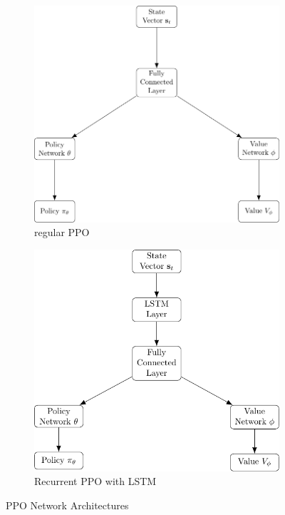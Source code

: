 \begin{figure}[ht!]
    \centering
    \begin{subfigure}{0.45\textwidth}
        \includegraphics[width=\textwidth]{./project3/tikz/ppo_diagram.pdf}
        \caption{regular PPO}
        \label{subfig3:architecturePPO}
    \end{subfigure}
    \hspace{1cm}
    \begin{subfigure}{0.45\textwidth}
        \includegraphics[width=\textwidth]{./project3/tikz/recurrentppo_diagram.pdf}
        \caption{Recurrent PPO with LSTM}
        \label{subfig3:architectureLSTMPPO}
    \end{subfigure}
    \caption{PPO Network Architectures} 
    \label{fig3:architecturePPO}
\end{figure}

